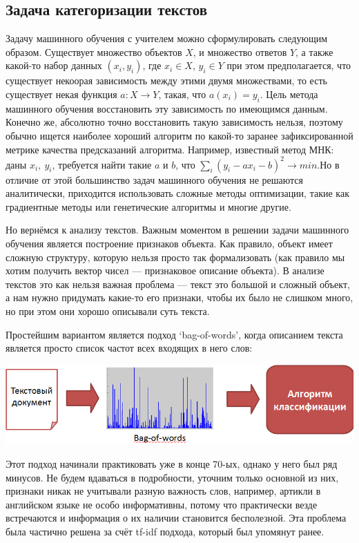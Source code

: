 \documentclass[a4paper,14pt]{extarticle}
\begin{document}
\subsection{Задача категоризации текстов}
Задачу машинного обучения с учителем можно сформулировать следующим образом. Существует множество объектов $X$, и множество ответов $Y$, а также какой-то набор данных $(x_i, y_i)$, где $x_i \in X$, $y_i \in Y$ при этом предполагается, что существует некоорая зависимость между этими двумя множествами, то есть существует некая функция $a \colon X \to Y$, такая, что $a(x_i) = y_i$. Цель метода машинного обучения восстановить эту зависимость по имеющимся данным. Конечно же, абсолютно точно восстановить такую зависимость нельзя, поэтому обычно ищется наиболее хороший алгоритм по какой-то заранее зафиксированной метрике качества предсказаний алгоритма. Например, известный метод МНК: даны $x_i,~y_i$, требуется найти такие $a$ и $b$, что $\sum_i (y_i - a x_i - b)^2 \to min$.Но в отличие от этой большинство задач машинного обучения не решаются аналитически, приходится использовать сложные методы оптимизации, такие как градиентные методы или генетические алгоритмы и многие другие.

Но вернёмся к анализу текстов. Важным моментом в решении задачи машинного обучения является построение признаков объекта. Как правило, объект имеет сложную структуру, которую нельзя просто так формализовать (как правило мы хотим получить вектор чисел --- признаковое описание объекта). В анализе текстов это как нельзя важная проблема --- текст это большой и сложный объект, а нам нужно придумать какие-то его признаки, чтобы их было не слишком много, но при этом они хорошо описывали суть текста.

Простейшим вариантом является подход `bag-of-words', когда описанием текста является просто список частот всех входящих в него слов:

\includegraphics[width=1.0\linewidth]{bag_of_words.png}

Этот подход начинали практиковать уже в конце 70-ых, однако у него был ряд минусов. Не будем вдаваться в подробности, уточним только основной из них, признаки никак не учитывали разную важность слов, например, артикли в английском языке не особо информативны, потому что практически везде встречаются и информация о их наличии становится бесполезной. Эта проблема была частично решена за счёт tf-idf подхода, который был упомянут ранее.
\end{document}
